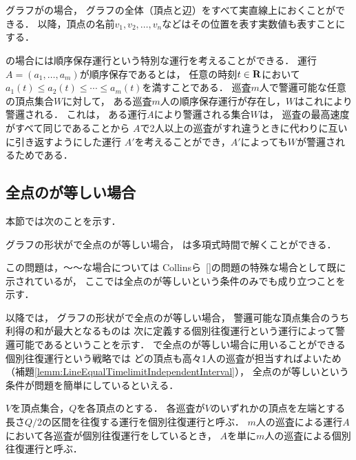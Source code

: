 \section{{\graphLine}}
\label{section: line}

グラフが{\graphLine}の場合，
グラフの全体（頂点と辺）をすべて実直線上におくことができる．
以降，頂点の名前$v_1, v_2, \ldots, v_n$などはその位置を表す実数値も表すことにする．

{\graphLine}の場合には順序保存運行という特別な運行を考えることができる．
運行$A = (a_1, \ldots, a_m)$が順序保存であるとは，
任意の時刻$t \in \mathbf R$において
$a_1(t) \leq a_2(t) \leq \cdots \leq a_m(t)$を満すことである．
巡査$m$人で警邏可能な任意の頂点集合$W$に対して，
ある巡査$m$人の順序保存運行が存在し，$W$はこれにより警邏される．
これは，
ある運行$A$により警邏される集合$W$は，
巡査の最高速度がすべて同じであることから
$A$で2人以上の巡査がすれ違うときに代わりに互いに引き返すようにした運行
$A'$を考えることができ，$A'$によっても$W$が警邏されるためである．



\subsection{全点の{\idletime}が等しい場合}
\label{subsec:LineUnaryTimelimit}


本節では次のことを示す．

\begin{theo}
  \label{theo:LineEqualTimelimit}
  グラフの形状が{\graphLine}で全点の{\idletime}が等しい場合，
  {\patProb}は多項式時間で解くことができる．
\end{theo}

この問題は，～～な場合については Collinsら~\ref{}の問題の特殊な場合として既に示されているが，
ここでは全点の{\idletime}が等しいという条件のみでも成り立つことを示す．


以降では，
グラフの形状が{\graphLine}で全点の{\idletime}が等しい場合，
警邏可能な頂点集合のうち利得の和が最大となるものは
次に定義する個別往復運行という運行によって警邏可能であるということを示す．
{\graphLine}で全点の{\idletime}が等しい場合に用いることができる
個別往復運行という戦略では
どの頂点も高々1人の巡査が担当すればよいため
（補題\ref{lemm:LineEqualTimelimitIndependentInterval}），
全点の{\idletime}が等しいという条件が問題を簡単にしているといえる．


\begin{defi}
  $V$を頂点集合，$Q$を各頂点の{\idletime}とする．
  各巡査が$V$のいずれかの頂点を左端とする長さ$Q/2$の区間を往復する運行を個別往復運行と呼ぶ．
  $m$人の巡査による運行$A$において各巡査が個別往復運行をしているとき，
  $A$を単に$m$人の巡査による個別往復運行と呼ぶ．
\end{defi}



